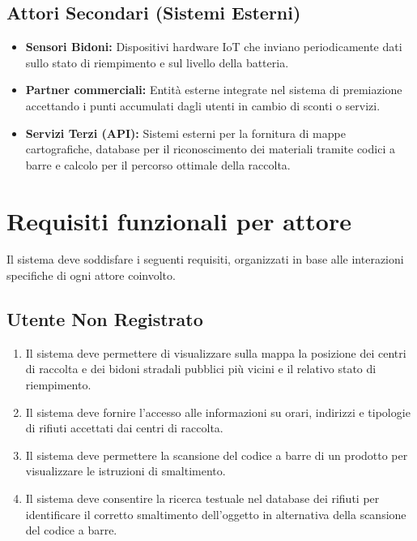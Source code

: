 \documentclass[12pt,a4paper]{article}
\begin{document}
\subsection{Attori Secondari (Sistemi Esterni)}
\begin{itemize}
    \item \textbf{Sensori Bidoni:} Dispositivi hardware IoT che inviano periodicamente dati sullo stato di riempimento e sul livello della batteria.
    \item \textbf{Partner commerciali:} Entità esterne integrate nel sistema di premiazione accettando i punti accumulati dagli utenti in cambio di sconti o servizi.
    \item \textbf{Servizi Terzi (API):} Sistemi esterni per la fornitura di mappe cartografiche, database per il riconoscimento dei materiali tramite codici a barre e calcolo per il percorso ottimale della raccolta.
\end{itemize}

\newpage

\section{Requisiti funzionali per attore}

Il sistema deve soddisfare i seguenti requisiti, organizzati in base alle interazioni specifiche di ogni attore coinvolto.

\subsection{Utente Non Registrato }
\begin{enumerate}[label=\textbf{(RF\arabic*)}]
    \item Il sistema deve permettere di visualizzare sulla mappa la posizione dei centri di raccolta e dei bidoni stradali pubblici più vicini e il  relativo stato di riempimento.
    \item Il sistema deve fornire l'accesso alle informazioni su orari, indirizzi e tipologie di rifiuti accettati dai centri di raccolta.
    \item Il sistema deve permettere la scansione del codice a barre di un prodotto per visualizzare le istruzioni di smaltimento.
    \item Il sistema deve consentire la ricerca testuale nel database dei rifiuti per identificare il corretto smaltimento dell'oggetto in alternativa della scansione del codice a barre.
\end{enumerate}
\end{document}
